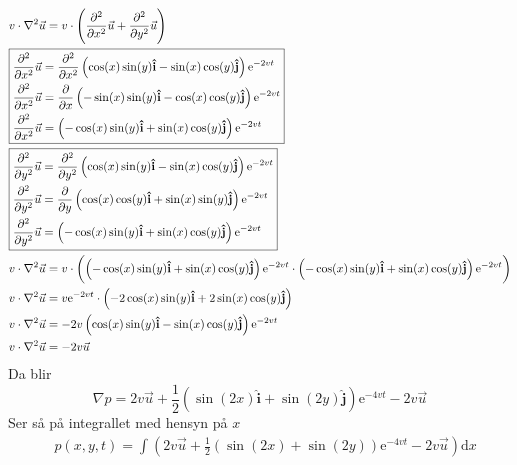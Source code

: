 \documentclass[a4paper,10pt,norsk]{article}
\newcommand{\dd}[1]{\mathrm{d}#1}
\newcommand{\uvec}[1]{\boldsymbol{\hat{\textbf{#1}}}}
\begin{document}
		\begin{align*}
			& v \cdot \nabla^2 \vec{u} = v \cdot \left( \frac{\partial ^2}{\partial x^2} \vec{u} + \frac{\partial ^2}{\partial y^2} \vec{u}  \right) \\
			&\boxed{%
				\begin{aligned}
					&\frac{\partial ^2}{\partial x^2} \vec{u} = \frac{\partial ^2}{\partial x^2 } \left( \cos(x) \sin(y) \uvec{i} - \sin(x) \cos(y) \uvec{j} \right) \mathrm{e}^{-2vt}\\ 
					&\frac{\partial ^2}{\partial x^2} \vec{u} = \frac{\partial }{\partial x} \left( -\sin(x) \sin(y) \uvec{i} - \cos(x) \cos(y) \uvec{j} \right) \mathrm{e}^{-2vt}\\
					& \frac{\partial ^2}{\partial x^2} \vec{u} = \left(- \cos(x)\sin(y) \uvec{i} + \sin(x) \cos(y) \uvec{j}  \right) \mathrm{e}^{-2vt}
			\end{aligned}}\\
			&\boxed{%
				\begin{aligned}
					&\frac{\partial ^2}{\partial y^2} \vec{u} = \frac{\partial ^2}{\partial y^2 } \left( \cos(x) \sin(y) \uvec{i} - \sin(x) \cos(y) \uvec{j} \right) \mathrm{e}^{-2vt}\\ 
					&\frac{\partial ^2}{\partial y^2} \vec{u} = \frac{\partial }{\partial y} \left( \cos(x) \cos(y) \uvec{i} + \sin(x) \sin(y) \uvec{j} \right) \mathrm{e}^{-2vt}\\
					& \frac{\partial ^2}{\partial y^2} \vec{u} = \left(- \cos(x) \sin(y) \uvec{i} + \sin(x) \cos(y) \uvec{j}  \right) \mathrm{e}^{-2vt}
			\end{aligned}}\\
			& v \cdot \nabla^2 \vec{u} = v \cdot \left ( \left(- \cos(x)\sin(y) \uvec{i} + \sin(x) \cos(y) \uvec{j}  \right) \mathrm{e}^{-2vt}
			\cdot \left(- \cos(x) \sin(y) \uvec{i} + \sin(x) \cos(y) \uvec{j}  \right) \mathrm{e}^{-2vt} \right)\\
			& v \cdot \nabla^2 \vec{u} = v \mathrm{e}^{-2vt} \cdot \left( -2 \cos(x) \sin(y) \uvec{i} + 2 \sin(x) \cos(y) \uvec{j} \right) \\
			& v \cdot \nabla^2 \vec{u} =-2v \left(\cos(x) \sin(y) \uvec{i} - \sin(x) \cos(y) \uvec{j}  \right)  \mathrm{e}^{-2vt}\\
			& v \cdot \nabla^2 \vec{u} = - 2v \vec{u} 
		\end{align*}
		Da blir \[
		\nabla p =2v \vec{u} + \frac{1}{2} \left( \sin(2x) \uvec{i} + \sin(2y) \uvec{j} \right) \mathrm{e}^{-4vt} - 2v \vec{u} 
		\] 
		Ser så på integrallet med hensyn på $x$ 
		\begin{align*}
			&p(x,y,t) = \int \left( 2v \vec{u} + \frac{1}{2} \left( \sin(2x)  + \sin(2y)  \right) \mathrm{e}^{-4vt} - 2v \vec{u} \right) \dd{x}
		\end{align*}
\end{document}
